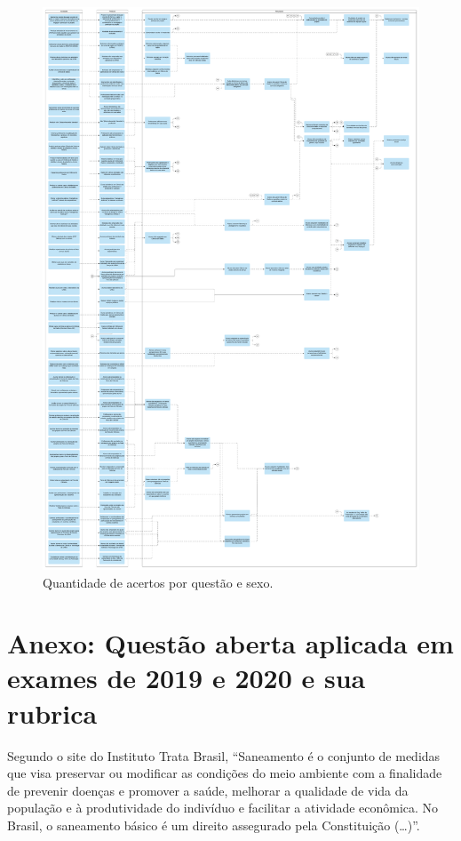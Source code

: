 \documentclass[
]{book}
\begin{document}
\begin{figure}

{\centering \includegraphics[width=0.75\linewidth,height=0.75\textheight]{images/Impactos/anexo1} 

}

\caption{Quantidade de acertos por questão e sexo.}\label{fig:impactoanexo1}
\end{figure}

\hypertarget{anexo-questuxe3o-aberta-aplicada-em-exames-de-2019-e-2020-e-sua-rubrica}{%
\section*{Anexo: Questão aberta aplicada em exames de 2019 e 2020 e sua rubrica}\label{anexo-questuxe3o-aberta-aplicada-em-exames-de-2019-e-2020-e-sua-rubrica}}

Segundo o site do Instituto Trata Brasil, ``Saneamento é o conjunto de medidas que visa preservar ou modificar as condições do meio ambiente com a finalidade de prevenir doenças e promover a saúde, melhorar a qualidade de vida da população e à produtividade do indivíduo e facilitar a atividade econômica. No Brasil, o saneamento básico é um direito assegurado pela Constituição (\ldots)''.
\end{document}
